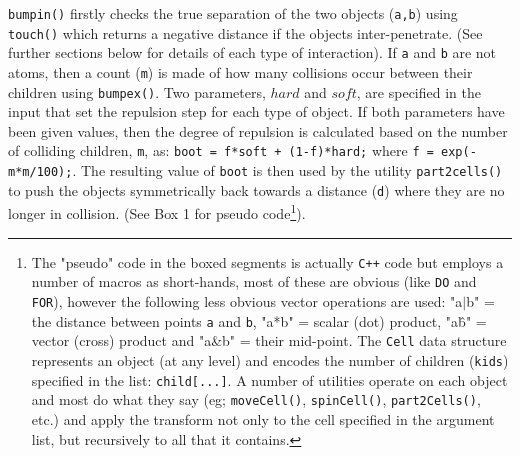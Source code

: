 {\tt bumpin()} firstly checks the true separation of the two objects ({\tt a,b}) using {\tt touch()}
which returns a negative distance if the objects inter-penetrate. (See further sections
below for details of each type of interaction).   If {\tt a} and {\tt b} are not atoms, then
a count ({\tt m}) is made of how many collisions occur between their children using {\tt bumpex()}.
Two parameters,  $hard$ and $soft$, are specified in the input that set the repulsion step
for each type of object.  If both parameters have been given values,
then the degree of repulsion is calculated based on the number of colliding children, {\tt m},
as:  {\tt boot = f*soft + (1-f)*hard;} where {\tt f = exp(-m*m/100);}.     The resulting value
of {\tt boot} is then used by the utility {\tt part2cells()} to push the objects symmetrically
back towards a distance ({\tt d}) where they are no longer in collision. (See Box 1 for
pseudo code\footnote{
The "pseudo" code in the boxed segments is actually {\tt C++} code but employs a number of macros
as short-hands, most of these are obvious (like {\tt DO} and {\tt FOR}), however the following
less obvious vector operations are used:
"{a$|$b}" = the distance between points {\tt a} and {\tt b},
"{a*b}" = scalar (dot) product,
"{a\^b}" = vector (cross) product and
"{a\&b}" = their mid-point.
The {\tt Cell} data structure represents an object (at any level) and encodes the 
number of children ({\tt kids}) specified in the list: {\tt child[...]}.
A number of utilities operate on each object and most do what they say (eg;
{\tt moveCell()}, {\tt spinCell()}, {\tt part2Cells()}, etc.) and apply the transform
not only to the cell specified in the argument list, but recursively to all that it 
contains.}).

